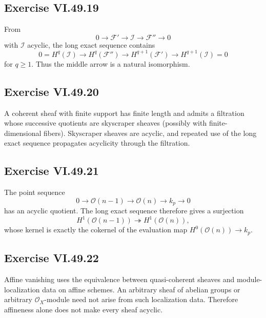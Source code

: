\subsection*{Exercise VI.49.19}
\begin{solution}
From
\[
0\to\mathcal F'\to\mathcal I\to\mathcal F''\to0
\]
with \(\mathcal I\) acyclic, the long exact sequence contains
\[
0=H^q(\mathcal I)\to H^q(\mathcal F'')\to H^{q+1}(\mathcal F')\to H^{q+1}(\mathcal I)=0
\]
for \(q\ge1\).  Thus the middle arrow is a natural isomorphism.
\end{solution}

\subsection*{Exercise VI.49.20}
\begin{solution}
A coherent sheaf with finite support has finite length and admits a filtration whose successive quotients are skyscraper sheaves (possibly with finite-dimensional fibers).  Skyscraper sheaves are acyclic, and repeated use of the long exact sequence propagates acyclicity through the filtration.
\end{solution}

\subsection*{Exercise VI.49.21}
\begin{solution}
The point sequence
\[
0\to\mathcal O(n-1)\to\mathcal O(n)\to k_p\to0
\]
has an acyclic quotient.  The long exact sequence therefore gives a surjection
\[
H^1(\mathcal O(n-1))\twoheadrightarrow H^1(\mathcal O(n)),
\]
whose kernel is exactly the cokernel of the evaluation map \(H^0(\mathcal O(n))\to k_p\).
\end{solution}

\subsection*{Exercise VI.49.22}
\begin{solution}
Affine vanishing uses the equivalence between quasi-coherent sheaves and module-localization data on affine schemes.  An arbitrary sheaf of abelian groups or arbitrary \(\mathcal O_X\)-module need not arise from such localization data.  Therefore affineness alone does not make every sheaf acyclic.
\end{solution}


